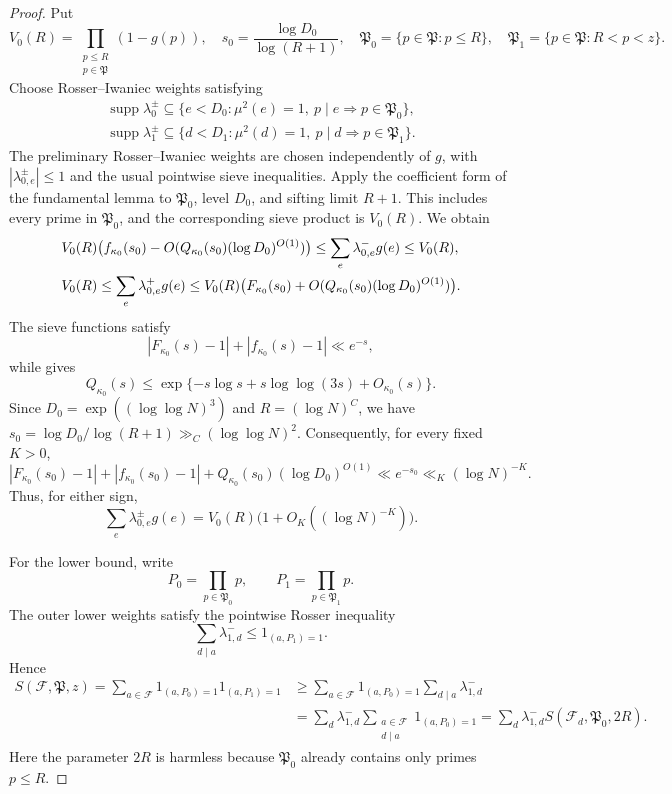 \documentclass[12pt,reqno]{amsart}
\numberwithin{equation}{section}
\theoremstyle{definition}
\theoremstyle{remark}
\begin{document}
\begin{proof}
Put
\[
 V_0(R)=\prod_{\substack{p\leq R\\ p\in\mathfrak P}}(1-g(p)),
 \quad
s_0=\frac{\log D_0}{\log(R+1)},\quad
 \mathfrak P_0=\{p\in\mathfrak P:p\leq R\},
 \quad
 \mathfrak P_1=\{p\in\mathfrak P:R<p<z\}.
\] 
Choose Rosser--Iwaniec weights satisfying
\begin{align}
 \operatorname{supp}\lambda_0^\pm
 \subseteq
 \{e<D_0:\mu^2(e)=1,\ p\mid e\Rightarrow p\in\mathfrak P_0\},\\
 \operatorname{supp}\lambda_1^\pm
 \subseteq
 \{d<D_1:\mu^2(d)=1,\ p\mid d\Rightarrow p\in\mathfrak P_1\}.
\end{align}
The preliminary Rosser--Iwaniec weights are chosen independently
of \(g\), with \(|\lambda_{0,e}^{\pm}|\leq1\) and the usual
pointwise sieve inequalities.
Apply the coefficient form of the fundamental lemma
\cite[(3.4)--(3.5)]{I80} to \(\mathfrak P_0\), level \(D_0\),
and sifting limit \(R+1\). This includes every prime in
\(\mathfrak P_0\), and the corresponding sieve product is
\(V_0(R)\). We obtain
\begin{align}\label{e:preliminarycoefficients10}
 &V_0(R)
 \bigl(f_{\kappa_0}(s_0)
       -O(Q_{\kappa_0}(s_0)(\log D_0)^{O(1)})\bigr)
 \leq
 \sum_e\lambda_{0,e}^-g(e)
 \leq V_0(R),\notag\\
 &V_0(R)
 \leq
 \sum_e\lambda_{0,e}^+g(e)
 \leq
 V_0(R)
 \bigl(F_{\kappa_0}(s_0)
       +O(Q_{\kappa_0}(s_0)(\log D_0)^{O(1)})\bigr).
\end{align}
The sieve functions satisfy
\[
 |F_{\kappa_0}(s)-1|+|f_{\kappa_0}(s)-1|
 \ll e^{-s},
\]
while \cite[(1.6)]{I80} gives
\[
 Q_{\kappa_0}(s)
 \leq
 \exp\{-s\log s+s\log\log(3s)+O_{\kappa_0}(s)\}.
\]
Since \(D_0=\exp((\log\log N)^3)\) and \(R=(\log N)^C\),
we have
\(s_0=\log D_0/\log(R+1)\gg_C(\log\log N)^2\).
Consequently, for every fixed \(K>0\),
\[
 |F_{\kappa_0}(s_0)-1|+|f_{\kappa_0}(s_0)-1|
 +Q_{\kappa_0}(s_0)(\log D_0)^{O(1)}
 \ll e^{-s_0}\ll_K(\log N)^{-K}.
\]
Thus, for either sign,
\begin{equation}\label{e:preliminarymain10}
 \sum_e\lambda_{0,e}^{\pm}g(e)
 =
 V_0(R)\bigl(1+O_K((\log N)^{-K})\bigr).
\end{equation}


For the lower bound, write
\[
 P_0=\prod_{p\in\mathfrak P_0}p,
 \qquad
 P_1=\prod_{p\in\mathfrak P_1}p.
\]
The outer lower weights satisfy the pointwise Rosser inequality
\[
 \sum_{d\mid a}\lambda_{1,d}^-
 \leq 1_{(a,P_1)=1}.
\]
Hence
\[
\begin{aligned}
 S(\mathcal F,\mathfrak P,z)
 =\sum_{a\in\mathcal F}
   1_{(a,P_0)=1}1_{(a,P_1)=1} &\geq
   \sum_{a\in\mathcal F}1_{(a,P_0)=1}
   \sum_{d\mid a}\lambda_{1,d}^-  \\
 &=\sum_d\lambda_{1,d}^-
   \sum_{\substack{a\in\mathcal F\\ d\mid a}}
   1_{(a,P_0)=1}
 =\sum_d\lambda_{1,d}^-S(\mathcal F_d,\mathfrak P_0,2R).
\end{aligned}
\]
Here the parameter \(2R\) is harmless because \(\mathfrak P_0\) already contains only primes
\(p\leq R\).



\end{proof}
\end{document}
